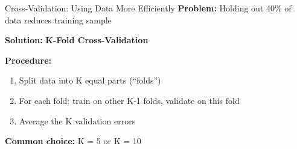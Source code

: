 \documentclass[10pt]{beamer}
\newcommand{\highlight}[1]{\textcolor{AccentOrange}{\textbf{#1}}}
\begin{document}
\begin{frame}{Cross-Validation: Using Data More Efficiently}
  \textbf{Problem:} Holding out 40\% of data reduces training sample
  
  \vspace{0.5em}
  \textbf{Solution:} \highlight{K-Fold Cross-Validation}
  
  \begin{center}
  \end{center}
  
  \textbf{Procedure:}
  \begin{enumerate}
    \item Split data into K equal parts (``folds'')
    \item For each fold: train on other K-1 folds, validate on this fold
    \item Average the K validation errors
  \end{enumerate}
  
  \textbf{Common choice:} K = 5 or K = 10
\end{frame}
\end{document}
